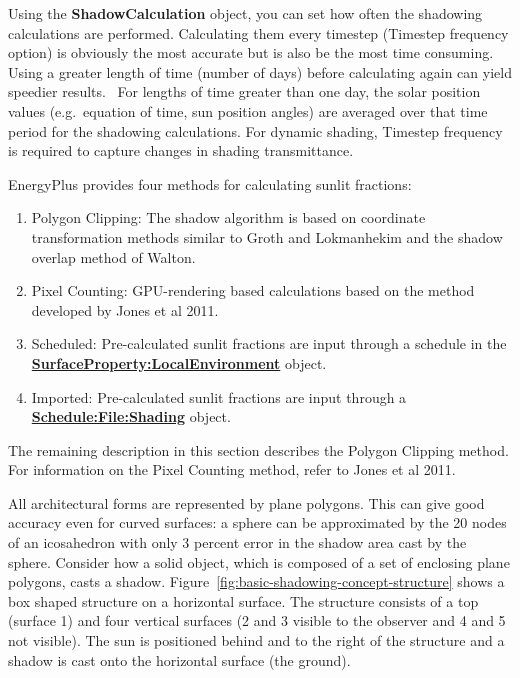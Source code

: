 Using the \textbf{ShadowCalculation} object, you can set how often the shadowing calculations are performed. Calculating them every timestep (Timestep frequency option) is obviously the most accurate but is also be the most time consuming.~ Using a greater length of time (number of days) before calculating again can yield speedier results.~ For lengths of time greater than one day, the solar position values (e.g.~equation of time, sun position angles) are averaged over that time period for the shadowing calculations. For dynamic shading, Timestep frequency is required to capture changes in shading transmittance.

EnergyPlus provides four methods for calculating sunlit fractions:

\begin{enumerate}
    \item Polygon Clipping: The shadow algorithm is based on coordinate transformation methods similar to Groth and Lokmanhekim and the shadow overlap method of Walton.
    \item Pixel Counting: GPU-rendering based calculations based on the method developed by Jones et al 2011.
    \item Scheduled: Pre-calculated sunlit fractions are input through a schedule in the \textbf{\hyperref[surfacePropertylocalEnvironment]{SurfaceProperty:LocalEnvironment}} object.
    \item Imported: Pre-calculated sunlit fractions are input through a \textbf{\hyperref[schedulefileshading]{Schedule:File:Shading}} object.
\end{enumerate}

The remaining description in this section describes the Polygon Clipping method. For information on the Pixel Counting method, refer to Jones et al 2011.

All architectural forms are represented by plane polygons. This can give good accuracy even for curved surfaces: a sphere can be approximated by the 20 nodes of an icosahedron with only 3 percent error in the shadow area cast by the sphere. Consider how a solid object, which is composed of a set of enclosing plane polygons, casts a shadow. Figure~\ref{fig:basic-shadowing-concept-structure} shows a box shaped structure on a horizontal surface. The structure consists of a top (surface 1) and four vertical surfaces (2 and 3 visible to the observer and 4 and 5 not visible). The sun is positioned behind and to the right of the structure and a shadow is cast onto the horizontal surface (the ground).

